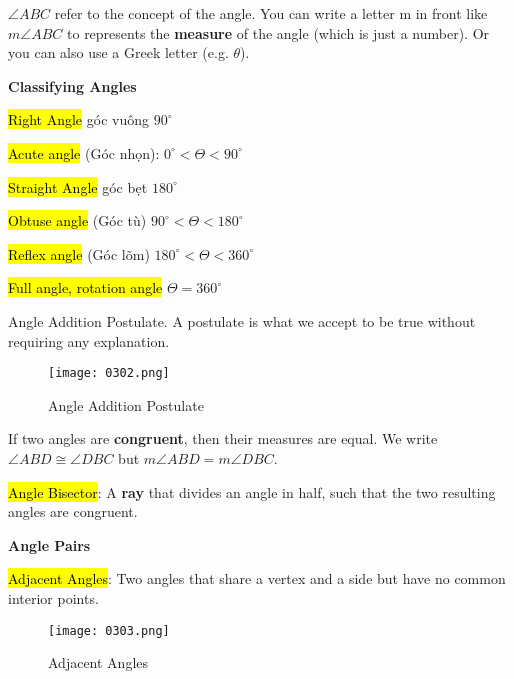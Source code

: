 $\angle ABC$ refer to the concept of the angle. You can write a letter m in front like $m\angle ABC$ to represents the \textbf{measure} of the angle (which is just a number). Or you can also use a Greek letter (e.g. $\theta$).

\vspace{1 cm}

\centerline{\textbf{\huge Classifying Angles}}

\vspace{0.2 cm}

\hl{Right Angle} góc vuông $90^{\circ}$

\hl{Acute angle} (Góc nhọn): $0^{\circ} < \Theta < 90^{\circ}$

\hl{Straight Angle} góc bẹt $180^{\circ}$

\hl{Obtuse angle} (Góc tù) $90^{\circ} < \Theta < 180^{\circ}$

\hl{Reflex angle} (Góc lõm) $180^{\circ} < \Theta < 360^{\circ}$

\hl{Full angle, rotation angle} $\Theta = 360^{\circ}$

\newpage

Angle Addition Postulate. A postulate is what we accept to be true without requiring any explanation.

\begin{figure}[htb!]
  \centering
  \texttt{[image: 0302.png]}
  \caption{Angle Addition Postulate}
\end{figure}

If two angles are \textbf{congruent}, then their measures are equal. We write $\angle ABD \cong \angle DBC$ but $m\angle ABD = m\angle DBC$.

\hl{Angle Bisector}: A \textbf{ray} that divides an angle in half, such that the two resulting angles are congruent.

\vspace{0.9 cm}

\centerline{\textbf{\huge Angle Pairs}}

\vspace{0.2 cm}

\hl{Adjacent Angles}: Two angles that share a vertex and a side but have no common interior points.

\begin{figure}[htb!]
  \centering
  \texttt{[image: 0303.png]}
  \caption{Adjacent Angles}
\end{figure}

\newpage


